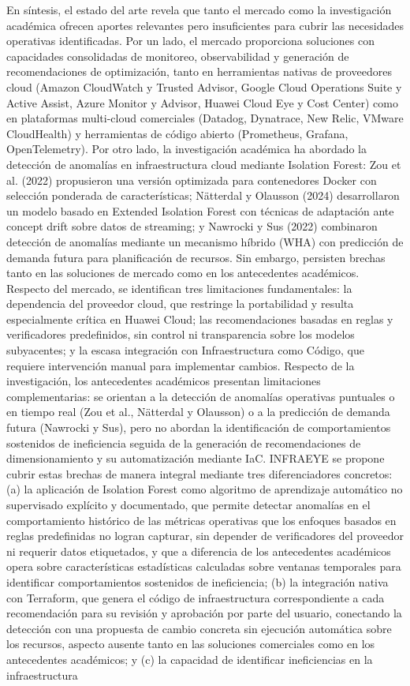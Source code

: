 En síntesis, el estado del arte revela que tanto el mercado como la investigación académica ofrecen aportes relevantes pero insuficientes para cubrir las necesidades operativas identificadas. Por un lado, el mercado proporciona soluciones con capacidades consolidadas de monitoreo, observabilidad y generación de recomendaciones de optimización, tanto en herramientas nativas de proveedores cloud (Amazon CloudWatch y Trusted Advisor, Google Cloud Operations Suite y Active Assist, Azure Monitor y Advisor, Huawei Cloud Eye y Cost Center) como en plataformas multi-cloud comerciales (Datadog, Dynatrace, New Relic, VMware CloudHealth) y herramientas de código abierto (Prometheus, Grafana, OpenTelemetry). Por otro lado, la investigación académica ha abordado la detección de anomalías en infraestructura cloud mediante Isolation Forest: Zou et al. (2022) propusieron una versión optimizada para contenedores Docker con selección ponderada de características; Nätterdal y Olausson (2024) desarrollaron un modelo basado en Extended Isolation Forest con técnicas de adaptación ante concept drift sobre datos de streaming; y Nawrocki y Sus (2022) combinaron detección de anomalías mediante un mecanismo híbrido (WHA) con predicción de demanda futura para planificación de recursos. Sin embargo, persisten brechas tanto en las soluciones de mercado como en los antecedentes académicos. Respecto del mercado, se identifican tres limitaciones fundamentales: la dependencia del proveedor cloud, que restringe la portabilidad y resulta especialmente crítica en Huawei Cloud; las recomendaciones basadas en reglas y verificadores predefinidos, sin control ni transparencia sobre los modelos subyacentes; y la escasa integración con Infraestructura como Código, que requiere intervención manual para implementar cambios. Respecto de la investigación, los antecedentes académicos presentan limitaciones complementarias: se orientan a la detección de anomalías operativas puntuales o en tiempo real (Zou et al., Nätterdal y Olausson) o a la predicción de demanda futura (Nawrocki y Sus), pero no abordan la identificación de comportamientos sostenidos de ineficiencia seguida de la generación de recomendaciones de dimensionamiento y su automatización mediante IaC. INFRAEYE se propone cubrir estas brechas de manera integral mediante tres diferenciadores concretos: (a) la aplicación de Isolation Forest como algoritmo de aprendizaje automático no supervisado explícito y documentado, que permite detectar anomalías en el comportamiento histórico de las métricas operativas que los enfoques basados en reglas predefinidas no logran capturar, sin depender de verificadores del proveedor ni requerir datos etiquetados, y que a diferencia de los antecedentes académicos opera sobre características estadísticas calculadas sobre ventanas temporales para identificar comportamientos sostenidos de ineficiencia; (b) la integración nativa con Terraform, que genera el código de infraestructura correspondiente a cada recomendación para su revisión y aprobación por parte del usuario, conectando la detección con una propuesta de cambio concreta sin ejecución automática sobre los recursos, aspecto ausente tanto en las soluciones comerciales como en los antecedentes académicos; y (c) la capacidad de identificar ineficiencias en la infraestructura 